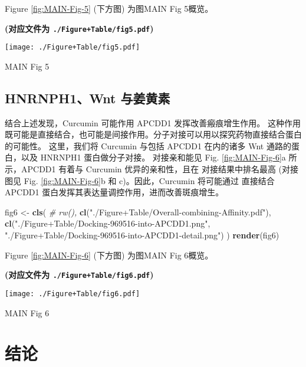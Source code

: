 \documentclass[
]{article}
\newenvironment{Shaded}{\begin{snugshade}}{\end{snugshade}}
\newcommand{\CommentTok}[1]{\textcolor[rgb]{0.56,0.35,0.01}{\textit{#1}}}
\newcommand{\KeywordTok}[1]{\textcolor[rgb]{0.13,0.29,0.53}{\textbf{#1}}}
\newcommand{\NormalTok}[1]{#1}
\newcommand{\StringTok}[1]{\textcolor[rgb]{0.31,0.60,0.02}{#1}}
\begin{document}
Figure \ref{fig:MAIN-Fig-5} (下方图) 为图MAIN Fig 5概览。

\textbf{(对应文件为 \texttt{./Figure+Table/fig5.pdf})}

\def\@captype{figure}
\begin{center}
\texttt{[image: ./Figure+Table/fig5.pdf]}
\caption{MAIN Fig 5}\label{fig:MAIN-Fig-5}
\end{center}

\hypertarget{hnrnph1wnt-ux4e0eux59dcux9ec4ux7d20}{%
\subsection{HNRNPH1、Wnt 与姜黄素}\label{hnrnph1wnt-ux4e0eux59dcux9ec4ux7d20}}

结合上述发现，Curcumin 可能作用 APCDD1 发挥改善瘢痕增生作用。
这种作用既可能是直接结合，也可能是间接作用。分子对接可以用以探究药物直接结合蛋白的可能性。
这里，我们将 Curcumin 与包括 APCDD1 在内的诸多 Wnt 通路的蛋白，以及 HNRNPH1 蛋白做分子对接。
对接亲和能见 Fig. \ref{fig:MAIN-Fig-6}a 所示，APCDD1 有着与 Curcumin 优异的亲和性，且在
对接结果中排名最高 (对接图见 Fig. \ref{fig:MAIN-Fig-6}b 和 c)。因此，Curcumin 将可能通过
直接结合 APCDD1 蛋白发挥其表达量调控作用，进而改善斑痕增生。

\begin{Shaded}
\begin{Highlighting}[]
\NormalTok{fig6 \textless{}{-}}\StringTok{ }\KeywordTok{cls}\NormalTok{(}
  \CommentTok{\# rw(),}
  \KeywordTok{cl}\NormalTok{(}\StringTok{"./Figure+Table/Overall{-}combining{-}Affinity.pdf"}\NormalTok{),}
  \KeywordTok{cl}\NormalTok{(}\StringTok{"./Figure+Table/Docking{-}969516{-}into{-}APCDD1.png"}\NormalTok{,}
    \StringTok{"./Figure+Table/Docking{-}969516{-}into{-}APCDD1{-}detail.png"}\NormalTok{)}
\NormalTok{)}
\KeywordTok{render}\NormalTok{(fig6)}
\end{Highlighting}
\end{Shaded}

Figure \ref{fig:MAIN-Fig-6} (下方图) 为图MAIN Fig 6概览。

\textbf{(对应文件为 \texttt{./Figure+Table/fig6.pdf})}

\def\@captype{figure}
\begin{center}
\texttt{[image: ./Figure+Table/fig6.pdf]}
\caption{MAIN Fig 6}\label{fig:MAIN-Fig-6}
\end{center}

\hypertarget{dis}{%
\section{结论}\label{dis}}
\end{document}
